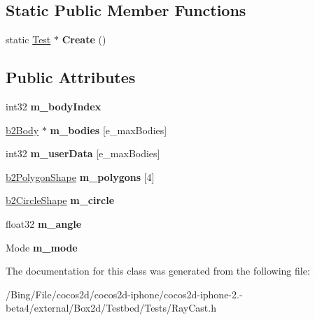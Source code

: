 \subsection*{Static Public Member Functions}
\begin{DoxyCompactItemize}
\item 
\hypertarget{class_ray_cast_a507c1eccdf5e35c9e1597a6f95132558}{static \hyperlink{class_test}{Test} $\ast$ {\bfseries Create} ()}\label{class_ray_cast_a507c1eccdf5e35c9e1597a6f95132558}

\end{DoxyCompactItemize}
\subsection*{Public Attributes}
\begin{DoxyCompactItemize}
\item 
\hypertarget{class_ray_cast_a400eade952a7d2a34eb0e03cddac380f}{int32 {\bfseries m\-\_\-body\-Index}}\label{class_ray_cast_a400eade952a7d2a34eb0e03cddac380f}

\item 
\hypertarget{class_ray_cast_ae04471a8e183219b88100e98d26a087f}{\hyperlink{classb2_body}{b2\-Body} $\ast$ {\bfseries m\-\_\-bodies} \mbox{[}e\-\_\-max\-Bodies\mbox{]}}\label{class_ray_cast_ae04471a8e183219b88100e98d26a087f}

\item 
\hypertarget{class_ray_cast_a7ab4a171d05591b17e86fceeb59b0de9}{int32 {\bfseries m\-\_\-user\-Data} \mbox{[}e\-\_\-max\-Bodies\mbox{]}}\label{class_ray_cast_a7ab4a171d05591b17e86fceeb59b0de9}

\item 
\hypertarget{class_ray_cast_a36a0c5669025a665856e9d797b9f9da4}{\hyperlink{classb2_polygon_shape}{b2\-Polygon\-Shape} {\bfseries m\-\_\-polygons} \mbox{[}4\mbox{]}}\label{class_ray_cast_a36a0c5669025a665856e9d797b9f9da4}

\item 
\hypertarget{class_ray_cast_aaa2bb324a7eab7f964c3273766b1f869}{\hyperlink{classb2_circle_shape}{b2\-Circle\-Shape} {\bfseries m\-\_\-circle}}\label{class_ray_cast_aaa2bb324a7eab7f964c3273766b1f869}

\item 
\hypertarget{class_ray_cast_a183b11a8ead163db928adb16470638ab}{float32 {\bfseries m\-\_\-angle}}\label{class_ray_cast_a183b11a8ead163db928adb16470638ab}

\item 
\hypertarget{class_ray_cast_a528ba94bf7059d5a32f9b74e740ed65f}{Mode {\bfseries m\-\_\-mode}}\label{class_ray_cast_a528ba94bf7059d5a32f9b74e740ed65f}

\end{DoxyCompactItemize}


The documentation for this class was generated from the following file\-:\begin{DoxyCompactItemize}
\item 
/\-Bing/\-File/cocos2d/cocos2d-\/iphone/cocos2d-\/iphone-\/2.-\/beta4/external/\-Box2d/\-Testbed/\-Tests/Ray\-Cast.\-h\end{DoxyCompactItemize}
